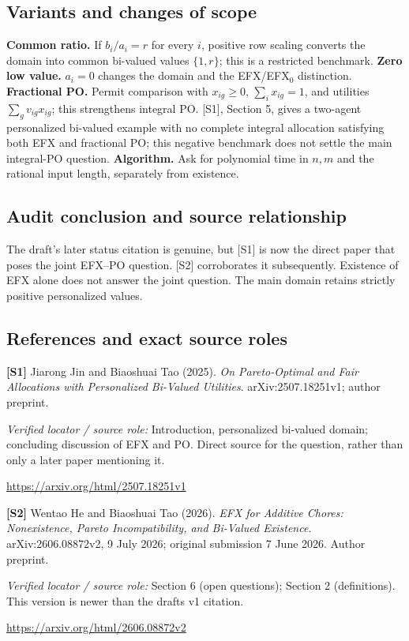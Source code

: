 \documentclass[11pt,a4paper]{article}
\begin{document}
\subsection*{Variants and changes of scope}

\textbf{Common ratio.} If $b_i/a_i=r$ for every $i$, positive row scaling converts the domain into common bi-valued values $\{1,r\}$; this is a restricted benchmark. \textbf{Zero low value.} $a_i=0$ changes the domain and the EFX/EFX$_0$ distinction. \textbf{Fractional PO.} Permit comparison with $x_{ig}\geq0$, $\sum_i x_{ig}=1$, and utilities $\sum_gv_{ig}x_{ig}$; this strengthens integral PO. [S1], Section 5, gives a two-agent personalized bi-valued example with no complete integral allocation satisfying both EFX and fractional PO; this negative benchmark does not settle the main integral-PO question. \textbf{Algorithm.} Ask for polynomial time in $n,m$ and the rational input length, separately from existence.

\subsection*{Audit conclusion and source relationship}

The draft's later status citation is genuine, but [S1] is now the direct paper that poses the joint EFX--PO question. [S2] corroborates it subsequently. Existence of EFX alone does not answer the joint question. The main domain retains strictly positive personalized values.

\subsection*{References and exact source roles}

{\footnotesize\raggedright
\par\noindent\textbf{[S1]} Jiarong Jin and Biaoshuai Tao (2025). \emph{On Pareto-Optimal and Fair Allocations with Personalized Bi-Valued Utilities}. arXiv:2507.18251v1; author preprint.\par \textit{Verified locator / source role:} Introduction, personalized bi-valued domain; concluding discussion of EFX and PO. Direct source for the question, rather than only a later paper mentioning it.\par \url{https://arxiv.org/html/2507.18251v1}\par\smallskip
\par\noindent\textbf{[S2]} Wentao He and Biaoshuai Tao (2026). \emph{EFX for Additive Chores: Nonexistence, Pareto Incompatibility, and Bi-Valued Existence}. arXiv:2606.08872v2, 9 July 2026; original submission 7 June 2026. Author preprint.\par \textit{Verified locator / source role:} Section 6 (open questions); Section 2 (definitions). This version is newer than the draft\textquotesingle s v1 citation.\par \url{https://arxiv.org/html/2606.08872v2}\par\smallskip
}
\end{document}
